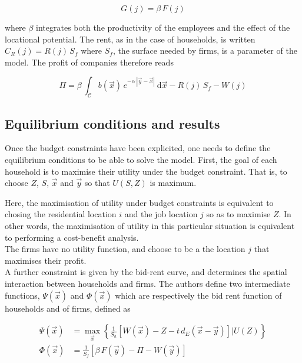 \begin{equation}
    G(j) = \beta\,F(j)
\end{equation}

where $\beta$ integrates both the productivity of the employees and the effect
of the locational potential. The rent, as
in the case of households, is written $C_R(j) = R(j)\,S_f$ where $S_f$, the
surface needed by firms, is a parameter of the model. The profit
of companies therefore reads

\begin{equation}
    \Pi = \beta\, \int_{\mathcal{C}} b(\vec{x})\,e^{-\alpha\,\left|\vec{y}-\vec{x}\right|}\:\mathrm{d}\vec{x}
        - R\left(j\right)\,S_f
        - W\left(j\right)
\end{equation}


\subsection{Equilibrium conditions and results}
\label{sub:equilibrium_conditions}

Once the budget constraints have been explicited, one needs to define
the equilibrium conditions to be able to solve the model. First, the goal of
each household is to maximise their utility under the budget constraint. That
is, to choose $Z$, $S$, $\vec{x}$ and $\vec{y}$ so that $U(S,Z)$ is maximum.

Here, the maximisation of utility under budget constraints is
equivalent to chosing the residential location $i$ and the job location $j$ so
as to maximise $Z$. In other words, the maximisation of utility in this
particular situation is equivalent to performing a cost-benefit analysis.\\ 

The firms have no utility function, and choose to be a the location $j$ that
maximises their profit.\\

A further constraint is given by the bid-rent curve, and determines the spatial
interaction between households and firms. The authors define two intermediate
functions, $\Psi(\vec{x})$ and $\Phi(\vec{x})$ which are respectively the bid
rent function of households and of firms, defined as

\begin{align}
    \Psi\left(\vec{x}\right) &= \max_{\vec{x}} \left\{ \frac{1}{S_h} \left[W(\vec{x} ) - Z -
    t\,d_E\left(\vec{x}-\vec{y}\right)\right] | U(Z)\right\}\\
    \Phi\left(\vec{x}\right) &= \frac{1}{S_f} \left[\beta\,F(\vec{y}) - \Pi -
W(\vec{y})\right]
\end{align}

